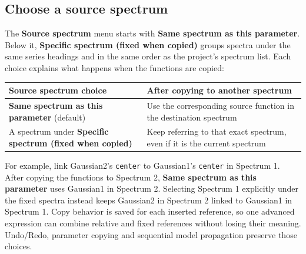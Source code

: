 \documentclass[
  10pt,
  a4paper,
  oneside]{scrreprt}
\begin{document}
\hypertarget{choose-a-source-spectrum}{%
\subsection{Choose a source spectrum}\label{choose-a-source-spectrum}}

The \textbf{Source spectrum} menu starts with \textbf{Same spectrum as
this parameter}. Below it, \textbf{Specific spectrum (fixed when
copied)} groups spectra under the same series headings and in the same
order as the project's spectrum list. Each choice explains what happens
when the functions are copied:

\begin{longtable}[]{@{}ll@{}}
\toprule
\begin{minipage}[b]{0.47\columnwidth}\raggedright
Source spectrum choice\strut
\end{minipage} & \begin{minipage}[b]{0.47\columnwidth}\raggedright
After copying to another spectrum\strut
\end{minipage}\tabularnewline
\midrule
\endhead
\begin{minipage}[t]{0.47\columnwidth}\raggedright
\textbf{Same spectrum as this parameter} (default)\strut
\end{minipage} & \begin{minipage}[t]{0.47\columnwidth}\raggedright
Use the corresponding source function in the destination spectrum\strut
\end{minipage}\tabularnewline
\begin{minipage}[t]{0.47\columnwidth}\raggedright
A spectrum under \textbf{Specific spectrum (fixed when copied)}\strut
\end{minipage} & \begin{minipage}[t]{0.47\columnwidth}\raggedright
Keep referring to that exact spectrum, even if it is the current
spectrum\strut
\end{minipage}\tabularnewline
\bottomrule
\end{longtable}

For example, link Gaussian2's \texttt{center} to Gaussian1's
\texttt{center} in Spectrum 1. After copying the functions to Spectrum
2, \textbf{Same spectrum as this parameter} uses Gaussian1 in Spectrum
2. Selecting Spectrum 1 explicitly under the fixed spectra instead keeps
Gaussian2 in Spectrum 2 linked to Gaussian1 in Spectrum 1. Copy behavior
is saved for each inserted reference, so one advanced expression can
combine relative and fixed references without losing their meaning.
Undo/Redo, parameter copying and sequential model propagation preserve
those choices.
\end{document}
